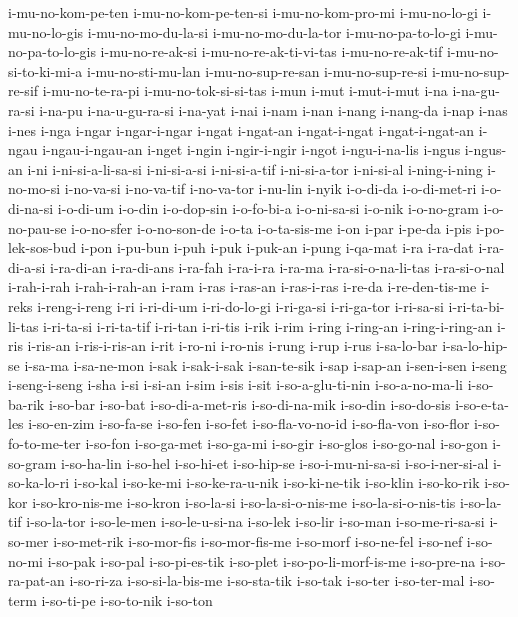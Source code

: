 {i-mu-no-kom-pe-ten i-mu-no-kom-pe-ten-si i-mu-no-kom-pro-mi i-mu-no-lo-gi
i-mu-no-lo-gis i-mu-no-mo-du-la-si i-mu-no-mo-du-la-tor
i-mu-no-pa-to-lo-gi i-mu-no-pa-to-lo-gis i-mu-no-re-ak-si
i-mu-no-re-ak-ti-vi-tas i-mu-no-re-ak-tif i-mu-no-si-to-ki-mi-a
i-mu-no-sti-mu-lan i-mu-no-sup-re-san i-mu-no-sup-re-si i-mu-no-sup-re-sif
i-mu-no-te-ra-pi i-mu-no-tok-si-si-tas i-mun i-mut i-mut-i-mut i-na
i-na-gu-ra-si i-na-pu i-na-u-gu-ra-si i-na-yat i-nai i-nam i-nan i-nang
i-nang-da i-nap i-nas i-nes i-nga i-ngar i-ngar-i-ngar i-ngat i-ngat-an
i-ngat-i-ngat i-ngat-i-ngat-an i-ngau i-ngau-i-ngau-an i-nget i-ngin
i-ngir-i-ngir i-ngot i-ngu-i-na-lis i-ngus i-ngus-an i-ni
i-ni-si-a-li-sa-si i-ni-si-a-si i-ni-si-a-tif i-ni-si-a-tor i-ni-si-al
i-ning-i-ning i-no-mo-si i-no-va-si i-no-va-tif i-no-va-tor i-nu-lin
i-nyik i-o-di-da i-o-di-met-ri i-o-di-na-si i-o-di-um i-o-din i-o-dop-sin
i-o-fo-bi-a i-o-ni-sa-si i-o-nik i-o-no-gram i-o-no-pau-se i-o-no-sfer
i-o-no-son-de i-o-ta i-o-ta-sis-me i-on i-par i-pe-da i-pis
i-po-lek-sos-bud i-pon i-pu-bun i-puh i-puk i-puk-an i-pung i-qa-mat i-ra
i-ra-dat i-ra-di-a-si i-ra-di-an i-ra-di-ans i-ra-fah i-ra-i-ra i-ra-ma
i-ra-si-o-na-li-tas i-ra-si-o-nal i-rah-i-rah i-rah-i-rah-an i-ram i-ras
i-ras-an i-ras-i-ras i-re-da i-re-den-tis-me i-reks i-reng-i-reng i-ri
i-ri-di-um i-ri-do-lo-gi i-ri-ga-si i-ri-ga-tor i-ri-sa-si
i-ri-ta-bi-li-tas i-ri-ta-si i-ri-ta-tif i-ri-tan i-ri-tis i-rik i-rim
i-ring i-ring-an i-ring-i-ring-an i-ris i-ris-an i-ris-i-ris-an i-rit
i-ro-ni i-ro-nis i-rung i-rup i-rus i-sa-lo-bar i-sa-lo-hip-se i-sa-ma
i-sa-ne-mon i-sak i-sak-i-sak i-san-te-sik i-sap i-sap-an i-sen-i-sen
i-seng i-seng-i-seng i-sha i-si i-si-an i-sim i-sis i-sit
i-so-a-glu-ti-nin i-so-a-no-ma-li i-so-ba-rik i-so-bar i-so-bat
i-so-di-a-met-ris i-so-di-na-mik i-so-din i-so-do-sis i-so-e-ta-les
i-so-en-zim i-so-fa-se i-so-fen i-so-fet i-so-fla-vo-no-id i-so-fla-von
i-so-flor i-so-fo-to-me-ter i-so-fon i-so-ga-met i-so-ga-mi i-so-gir
i-so-glos i-so-go-nal i-so-gon i-so-gram i-so-ha-lin i-so-hel i-so-hi-et
i-so-hip-se i-so-i-mu-ni-sa-si i-so-i-ner-si-al i-so-ka-lo-ri i-so-kal
i-so-ke-mi i-so-ke-ra-u-nik i-so-ki-ne-tik i-so-klin i-so-ko-rik i-so-kor
i-so-kro-nis-me i-so-kron i-so-la-si i-so-la-si-o-nis-me
i-so-la-si-o-nis-tis i-so-la-tif i-so-la-tor i-so-le-men i-so-le-u-si-na
i-so-lek i-so-lir i-so-man i-so-me-ri-sa-si i-so-mer i-so-met-rik
i-so-mor-fis i-so-mor-fis-me i-so-morf i-so-ne-fel i-so-nef i-so-no-mi
i-so-pak i-so-pal i-so-pi-es-tik i-so-plet i-so-po-li-morf-is-me
i-so-pre-na i-so-ra-pat-an i-so-ri-za i-so-si-la-bis-me i-so-sta-tik
i-so-tak i-so-ter i-so-ter-mal i-so-term i-so-ti-pe i-so-to-nik i-so-ton
}
